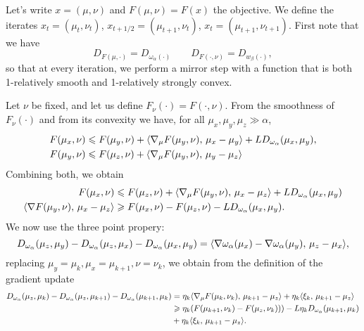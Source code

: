 \documentclass[a4paper, 10pt]{article}
\begin{document}
Let's write $x = (\mu, \nu)$  and $F(\mu, \nu) = F(x)$ the objective. We define the iterates $x_{t} = (\mu_t, \nu_t)$, $x_{t+1/2} = (\mu_{t+1}, \nu_t)$, 
$x_{t} = (\mu_{t+1}, \nu_{t+1})$. First note that we have
\begin{equation}
    D_{F(\mu, \cdot)} = D_{\omega_\alpha(\cdot)}\qquad D_{F(\cdot, \nu)} = D_{w_\beta(\cdot)},
\end{equation}
so that at every iteration, we perform a mirror step with a function that is both 1-relatively smooth and 1-relatively strongly convex.

Let $\nu$ be fixed, and let us define $F_\nu(\cdot) = F(\cdot, \nu)$. From the
smoothness of $F_\nu(\cdot)$ and from its convexity we have, for all 
$\mu_x, \mu_y, \mu_z \gg \alpha$,
\begin{align}
    F(\mu_x, \nu) &\leqslant F(\mu_y, \nu)
     + \langle \nabla_\mu F(\mu_y, \nu),\,\mu_x- \mu_y\rangle + L D_{\omega_\alpha}(\mu_x, \mu_y), \\
    F(\mu_y, \nu) &\leqslant F(\mu_z, \nu) + \langle \nabla_\mu F(\mu_y, \nu),\,\mu_y - \mu_z\rangle
\end{align}
Combining both, we obtain
\begin{align}
    F(\mu_x, \nu) &\leqslant F(\mu_z, \nu) + 
    \langle \nabla_\mu F(\mu_y, \nu),\,\mu_x - \mu_z\rangle + L D_{\omega_\alpha}(\mu_x, \mu_y) \\
    \langle \nabla F(\mu_y, \nu),\,\mu_x - \mu_z\rangle 
    &\geqslant F(\mu_x, \nu) - F(\mu_z, \nu) - L D_{\omega_\alpha}(\mu_x, \mu_y).
\end{align}
We now use the three point propery:
\begin{equation}
    D_{\omega_\alpha}(\mu_z, \mu_y) - D_{\omega_\alpha}(\mu_z, \mu_x) 
    - D_{\omega_\alpha}(\mu_x, \mu_y) 
    = \langle \nabla \omega_\alpha(\mu_x) - \nabla \omega_\alpha(\mu_y),\,\mu_z - \mu_x\rangle,
\end{equation}
replacing $\mu_y = \mu_{k}, \mu_x = \mu_{k+1}, \nu = \nu_k$, we obtain from the definition of the gradient update
\begin{align}
    D_{\omega_\alpha}(\mu_z, \mu_k) - D_{\omega_\alpha}(\mu_z, \mu_{k+1}) 
    - D_{\omega_\alpha}(\mu_{k+1}, \mu_k) &=
     \eta_k \langle \nabla_\mu F(\mu_k, \nu_k),\,\mu_{k+1} - \mu_z\rangle 
     + \eta_k \langle \xi_k,\,\mu_{k+1} - \mu_z\rangle \\
    &\geqslant \eta_k (F(\mu_{k+1}, \nu_k) - F(\mu_z, \nu_k)))
     - L \eta_k D_{\omega_\alpha}   (\mu_{k+1},\mu_k) \\
     &+ \eta_k \langle \xi_k,\,\mu_{k+1} - \mu_z\rangle.
\end{align}
\end{document}

